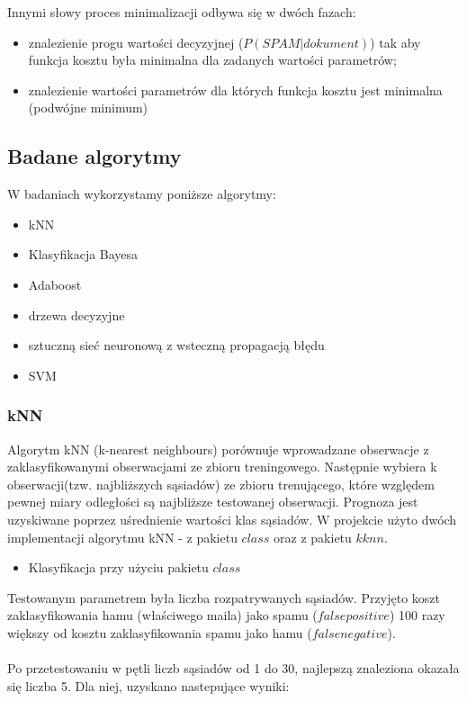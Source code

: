 \documentclass[fleqn]{article}
\begin{document}
Innymi słowy proces minimalizacji odbywa się w dwóch fazach:
\begin{itemize}
  \item znalezienie progu wartości decyzyjnej ($P(SPAM|dokument)$) tak aby funkcja kosztu była minimalna dla zadanych wartości parametrów;
  \item znalezienie wartości parametrów dla których funkcja kosztu jest minimalna (podwójne minimum)
\end{itemize}

\subsection{Badane algorytmy}
W badaniach wykorzystamy poniższe algorytmy:
\begin{itemize}
    \item kNN
    \item Klasyfikacja Bayesa
    \item Adaboost
    \item drzewa decyzyjne
    \item sztuczną sieć neuronową z wsteczną propagacją błędu
    \item SVM
\end{itemize}



\subsubsection{kNN}
Algorytm kNN (k-nearest neighbours) porównuje wprowadzane obserwacje z zaklasyfikowanymi obserwacjami ze zbioru treningowego. Następnie wybiera k obserwacji(tzw. najbliższych sąsiadów) ze zbioru trenującego, które względem pewnej miary odległości są najbliższe testowanej obserwacji. Prognoza jest uzyskiwane poprzez uśrednienie wartości klas sąsiadów. W projekcie użyto dwóch implementacji algorytmu kNN - z pakietu $class$ oraz z pakietu $kknn$.

\begin{itemize}
    \item Klasyfikacja przy użyciu pakietu $class$ 
\end{itemize}

\noindent Testowanym parametrem była liczba rozpatrywanych sąsiadów. Przyjęto koszt zaklasyfikowania hamu (właściwego maila) jako spamu ($false positive$) 100 razy większy od kosztu zaklasyfikowania spamu jako hamu ($false negative$).
\\ \\
\noindent Po przetestowaniu w pętli liczb sąsiadów od 1 do 30, najlepszą znaleziona okazała się liczba 5. Dla niej, uzyskano nastepujące wyniki:
\end{document}

